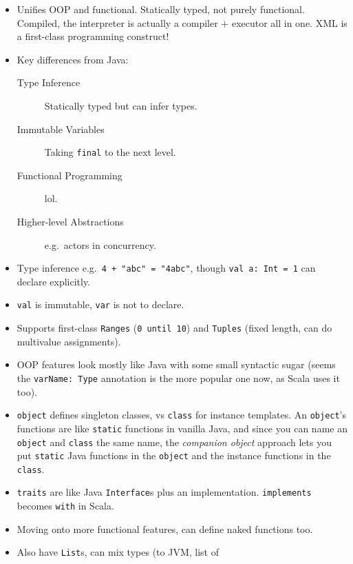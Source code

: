 \documentclass[10pt]{article}
\begin{document}
\begin{itemize}
    \item Unifies OOP and functional. Statically typed, not purely functional.
        Compiled, the interpreter is actually a compiler + executor all in one.
        XML is a first-class programming construct!
    \item Key differences from Java:
        \begin{description}
            \item[Type Inference] Statically typed but can infer types.
            \item[Immutable Variables] Taking \lstinline{final} to the next
                level.
            \item[Functional Programming] lol.
            \item[Higher-level Abstractions] e.g.\ actors in concurrency.
        \end{description}
    \item Type inference e.g.\ \lstinline{4 + "abc" = "4abc"}, though
        \lstinline{val a: Int = 1} can declare explicitly.
    \item \lstinline{val} is immutable, \lstinline{var} is not to declare.
    \item Supports first-class \lstinline{Ranges} (\lstinline{0 until 10}) and
        \lstinline{Tuples} (fixed length, can do multivalue assignments).
    \item OOP features look mostly like Java with some small syntactic sugar
        (seems the \lstinline{varName: Type} annotation is the more popular one
        now, as Scala uses it too).
    \item \lstinline{object} defines singleton classes, vs \lstinline{class} for
        instance templates. An \lstinline{object}'s functions are like
        \lstinline{static} functions in vanilla Java, and since you can name an
        \lstinline{object} and \lstinline{class} the same name, the
        \emph{companion object} approach lets you put \lstinline{static} Java
        functions in the \lstinline{object} and the instance functions in the
        \lstinline{class}.
    \item \lstinline{traits} are like Java \lstinline{Interface}s plus an
        implementation. \lstinline{implements} becomes \lstinline{with} in Scala.
    \item Moving onto more functional features, can define naked functions too.
    \item Also have \lstinline{List}s, can mix types (to JVM, list of

\end{itemize}
\end{document}
